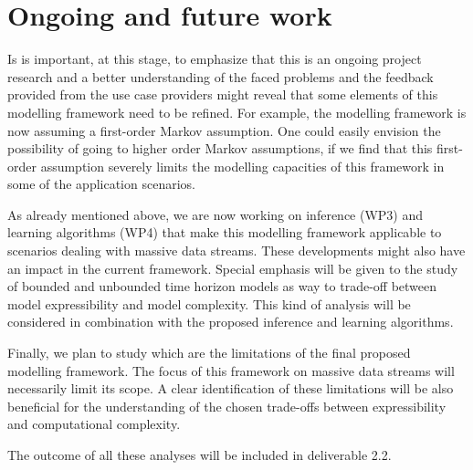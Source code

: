 \section{Ongoing and future work}\label{section:conclusions}

Is is important, at this stage, to emphasize that this is an ongoing project research and a better understanding of the faced problems and the feedback provided from the use case providers might reveal that some elements of this modelling framework need to be refined.  For example, the modelling framework is now assuming a first-order Markov assumption. One could easily envision the possibility of going to higher order Markov assumptions, if we find that this first-order assumption severely limits the modelling capacities of this framework in some of the application scenarios. 

As already mentioned above,  we are now working on inference (WP3) and learning algorithms (WP4) that make this modelling framework applicable to scenarios dealing with massive data streams. These developments might also have an impact in the current framework. Special emphasis will be given to the study of bounded and unbounded time horizon models as way to trade-off between model expressibility and model complexity. This kind of analysis will be considered in combination with the proposed inference and learning algorithms.

Finally, we plan to study which are the limitations of the final proposed modelling framework. The focus of this  framework on massive data streams will necessarily limit its scope. A clear identification of these limitations will be also beneficial for the understanding of the chosen trade-offs between expressibility and computational complexity.

The outcome of all these analyses will be included in deliverable 2.2.
